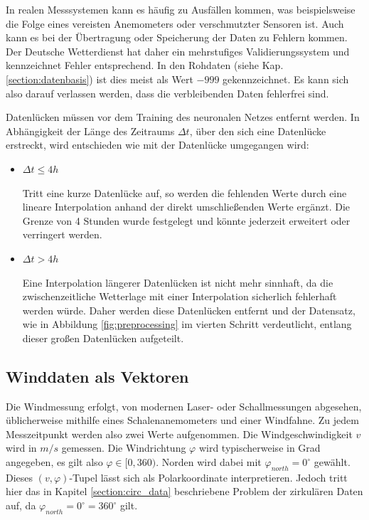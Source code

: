 \documentclass[
12pt, %
toc=listofnumbered, %
toc=chapterentrydotfill, %
numbers=noenddot, %
captions=tableheading, %
bibliography=numbered
]{scrreprt}
\let\Oldsubsection\subsection
\renewcommand{\subsection}{\FloatBarrier\Oldsubsection}
\begin{document}
In realen Messsystemen kann es häufig zu Ausfällen kommen, was beispielsweise die Folge eines vereisten Anemometers oder verschmutzter Sensoren ist. Auch kann es bei der Übertragung oder Speicherung der Daten zu Fehlern kommen. Der Deutsche Wetterdienst hat daher ein mehrstufiges Validierungssystem und kennzeichnet Fehler entsprechend. In den Rohdaten (siehe Kap. \ref{section:datenbasis}) ist dies meist als Wert $-999$ gekennzeichnet. Es kann sich also darauf verlassen werden, dass die verbleibenden Daten fehlerfrei sind. 

Datenlücken müssen vor dem Training des neuronalen Netzes entfernt werden. In Abhängigkeit der Länge des Zeitraums $\Delta t$, über den sich eine Datenlücke erstreckt, wird entschieden wie mit der Datenlücke umgegangen wird:

\begin{itemize}
	\item $\Delta t \leq 4h$
	
	Tritt eine kurze Datenlücke auf, so werden die fehlenden Werte durch eine lineare Interpolation anhand der direkt umschließenden Werte ergänzt. Die Grenze von 4 Stunden wurde festgelegt und könnte jederzeit erweitert oder verringert werden.

	\item $\Delta t > 4h$

	Eine Interpolation längerer Datenlücken ist nicht mehr sinnhaft, da die zwischenzeitliche Wetterlage mit einer Interpolation sicherlich fehlerhaft werden würde. Daher werden diese Datenlücken entfernt und der Datensatz, wie in Abbildung \ref{fig:preprocessing} im vierten Schritt verdeutlicht, entlang dieser großen Datenlücken aufgeteilt.

\end{itemize}

\subsection{Winddaten als Vektoren}\label{section:Winddaten_vec}
Die Windmessung erfolgt, von modernen Laser- oder Schallmessungen abgesehen, üblicherweise mithilfe eines Schalenanemometers und einer Windfahne. Zu jedem Messzeitpunkt werden also zwei Werte aufgenommen. Die Windgeschwindigkeit $v$ wird in $m/s$ gemessen. Die Windrichtung $\varphi$ wird typischerweise in Grad angegeben, es gilt also $\varphi \in [0,360)$. Norden wird dabei mit $\varphi_{north} = 0^\circ$ gewählt. Dieses $(v,\varphi)$-Tupel lässt sich als Polarkoordinate interpretieren. Jedoch tritt hier das in Kapitel \ref{section:circ_data} beschriebene Problem der zirkulären Daten auf, da $\varphi_{north} = 0^\circ = 360^\circ$ gilt.
\end{document}
